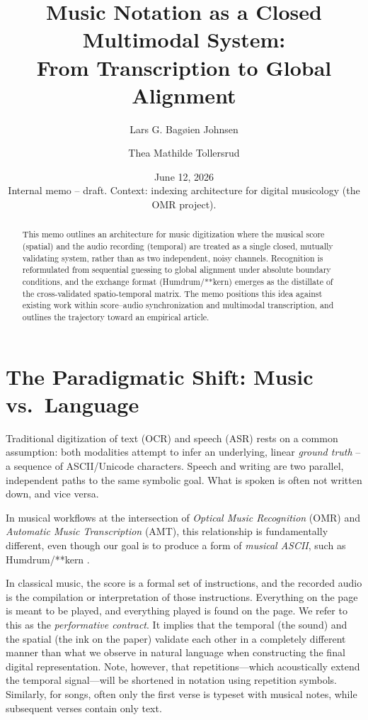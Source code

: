\documentclass[11pt,a4paper]{article}
\title{\bfseries Music Notation as a Closed Multimodal System:\\
\large From Transcription to Global Alignment}
\author{Lars G. Bagøien Johnsen}
\author{Thea Mathilde Tollersrud}
\affil{\small The DH Lab, National Library of Norway}
\date{June 12, 2026 \\[2pt] \small Internal memo -- draft. Context: indexing architecture for digital musicology (the OMR project).}
\begin{document}
\maketitle

\begin{abstract}
\noindent
This memo outlines an architecture for music digitization where the musical score (spatial) and the audio recording (temporal) are treated as a single closed, mutually validating system, rather than as two independent, noisy channels. Recognition is reformulated from sequential guessing to global alignment under absolute boundary conditions, and the exchange format (Humdrum/**kern) emerges as the distillate of the cross-validated spatio-temporal matrix. The memo positions this idea against existing work within score--audio synchronization and multimodal transcription, and outlines the trajectory toward an empirical article.
\end{abstract}

\section{The Paradigmatic Shift: Music vs.\ Language}

Traditional digitization of text (OCR) and speech (ASR) rests on a common assumption: both modalities attempt to infer an underlying, linear \emph{ground truth} -- a sequence of ASCII/Unicode characters. Speech and writing are two parallel, independent paths to the same symbolic goal. What is spoken is often not written down, and vice versa.

In musical workflows at the intersection of \emph{Optical Music Recognition} (OMR) and \emph{Automatic Music Transcription} (AMT), this relationship is fundamentally different, even though our goal is to produce a form of \emph{musical ASCII}, such as Humdrum/**kern \cite{huron2002}.

In classical music, the score is a formal set of instructions, and the recorded audio is the compilation or interpretation of those instructions. Everything on the page is meant to be played, and everything played is found on the page. We refer to this as the \emph{performative contract}. It implies that the temporal (the sound) and the spatial (the ink on the paper) validate each other in a completely different manner than what we observe in natural language when constructing the final digital representation. Note, however, that repetitions—which acoustically extend the temporal signal—will be shortened in notation using repetition symbols. Similarly, for songs, often only the first verse is typeset with musical notes, while subsequent verses contain only text.
\end{document}
